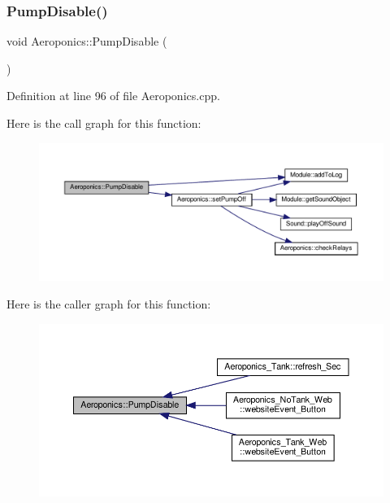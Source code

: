\mbox{\label{class_aeroponics_a235ada2ee2e5ab79542da63e3fc70cb5}} 
\subsubsection{\texorpdfstring{Pump\+Disable()}{PumpDisable()}\hspace{0.1cm}{\footnotesize\ttfamily [1/2]}}
{\footnotesize\ttfamily void Aeroponics\+::\+Pump\+Disable (\begin{DoxyParamCaption}{ }\end{DoxyParamCaption})\hspace{0.3cm}{\ttfamily [protected]}}



Definition at line 96 of file Aeroponics.\+cpp.

Here is the call graph for this function\+:
\nopagebreak
\begin{figure}[H]
\begin{center}
\leavevmode
\includegraphics[width=350pt]{class_aeroponics_a235ada2ee2e5ab79542da63e3fc70cb5_cgraph}
\end{center}
\end{figure}
Here is the caller graph for this function\+:
\nopagebreak
\begin{figure}[H]
\begin{center}
\leavevmode
\includegraphics[width=350pt]{class_aeroponics_a235ada2ee2e5ab79542da63e3fc70cb5_icgraph}
\end{center}
\end{figure}
\mbox{\label{class_aeroponics_a235ada2ee2e5ab79542da63e3fc70cb5}} 
